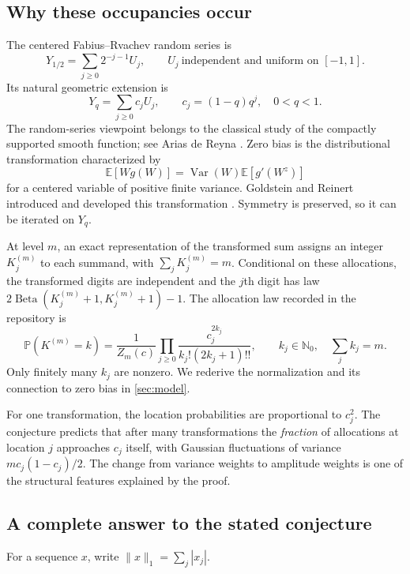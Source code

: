 \documentclass[11pt,a4paper]{article}
\numberwithin{equation}{section}
\theoremstyle{definition}
\theoremstyle{remark}
\newcommand{\E}{\mathbb E}
\newcommand{\PP}{\mathbb P}
\newcommand{\N}{\mathbb N}
\newcommand{\Var}{\operatorname{Var}}
\begin{document}
\subsection{Why these occupancies occur}
The centered Fabius--Rvachev random series is
\[
Y_{1/2}=\sum_{j\ge0}2^{-j-1}U_j,
\qquad U_j\ \text{independent and uniform on }[-1,1].
\]
Its natural geometric extension is
\begin{equation}
Y_q=\sum_{j\ge0}c_jU_j,
\qquad c_j=(1-q)q^j,\quad 0<q<1.
\label{eq:geometric}
\end{equation}
The random-series viewpoint belongs to the classical study of the compactly
supported smooth function; see Arias de Reyna \cite{arias}. Zero bias is the
distributional transformation characterized by
\begin{equation}
\E[Wg(W)]=\Var(W)\E[g'(W^z)]
\label{eq:zero-bias}
\end{equation}
for a centered variable of positive finite variance. Goldstein and Reinert
introduced and developed this transformation \cite{goldstein-reinert}.
Symmetry is preserved, so it can be iterated on $Y_q$.

At level $m$, an exact representation of the transformed sum assigns an
integer $K_j^{(m)}$ to each summand, with $\sum_jK_j^{(m)}=m$.
Conditional on these allocations, the transformed digits are independent
and the $j$th digit has law $2\operatorname{Beta}(K_j^{(m)}+1,
K_j^{(m)}+1)-1$. The allocation law recorded in the repository is
\begin{equation}
\PP(K^{(m)}=k)=\frac1{Z_m(c)}
 \prod_{j\ge0}\frac{c_j^{2k_j}}{k_j!(2k_j+1)!!},
\qquad k_j\in\N_0,\quad \sum_jk_j=m.
\label{eq:allocation}
\end{equation}
Only finitely many $k_j$ are nonzero. We rederive the normalization and its
connection to zero bias in \cref{sec:model}.

For one transformation, the location probabilities are proportional to
$c_j^2$. The conjecture predicts that after many transformations the
\emph{fraction} of allocations at location $j$ approaches $c_j$ itself,
with Gaussian fluctuations of variance $mc_j(1-c_j)/2$. The change from
variance weights to amplitude weights is one of the structural features
explained by the proof.

\subsection{A complete answer to the stated conjecture}
For a sequence $x$, write $\|x\|_1=\sum_j|x_j|$.
\end{document}
